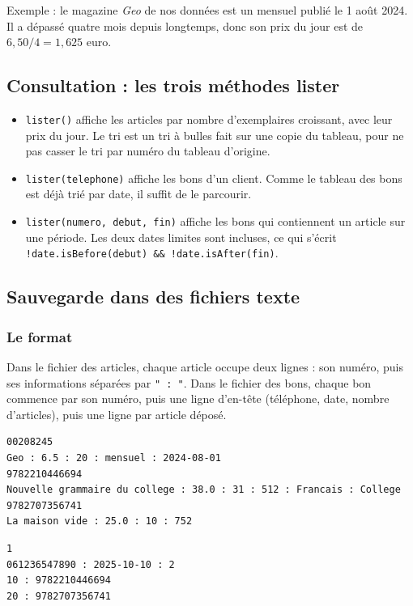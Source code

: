 \documentclass[11pt,a4paper]{article}
\newcommand{\code}[1]{\texttt{#1}}
\begin{document}
Exemple : le magazine \emph{Geo} de nos données est un mensuel publié le 1\ier{} août 2024. Il a
dépassé quatre mois depuis longtemps, donc son prix du jour est de $6{,}50 / 4 = 1{,}625$ euro.

\subsection{Consultation : les trois méthodes lister}

\begin{itemize}
\item \code{lister()} affiche les articles par nombre d'exemplaires croissant, avec leur prix du
jour. Le tri est un tri à bulles fait sur une copie du tableau, pour ne pas casser le tri par
numéro du tableau d'origine.
\item \code{lister(telephone)} affiche les bons d'un client. Comme le tableau des bons est déjà
trié par date, il suffit de le parcourir.
\item \code{lister(numero, debut, fin)} affiche les bons qui contiennent un article sur une
période. Les deux dates limites sont incluses, ce qui s'écrit
\code{!date.isBefore(debut) \&\& !date.isAfter(fin)}.
\end{itemize}

\subsection{Sauvegarde dans des fichiers texte}

\subsubsection*{Le format}

Dans le fichier des articles, chaque article occupe deux lignes : son numéro, puis ses informations
séparées par \code{" : "}. Dans le fichier des bons, chaque bon commence par son numéro, puis une
ligne d'en-tête (téléphone, date, nombre d'articles), puis une ligne par article déposé.

\begin{lstlisting}[language={}]
00208245
Geo : 6.5 : 20 : mensuel : 2024-08-01
9782210446694
Nouvelle grammaire du college : 38.0 : 31 : 512 : Francais : College
9782707356741
La maison vide : 25.0 : 10 : 752
\end{lstlisting}

\begin{lstlisting}[language={}]
1
061236547890 : 2025-10-10 : 2
10 : 9782210446694
20 : 9782707356741
\end{lstlisting}
\end{document}
